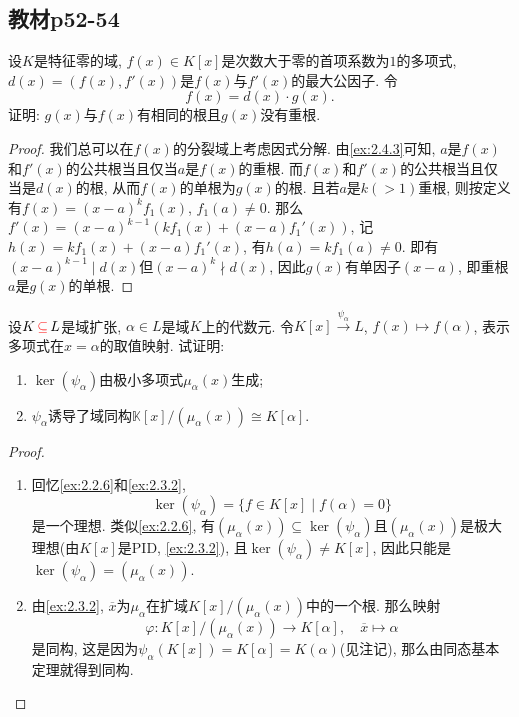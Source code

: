 \subsection{教材p52-54}

\begin{problem}\label{ex:3.1.1}
    设$K$是特征零的域, $f(x) \in K[x]$是次数大于零的首项系数为$1$的多项式, $d(x) = (f(x), f'(x))$是$f(x)$与$f'(x)$的最大公因子. 令
    \[
        f(x) = d(x) \cdot g(x).
    \]
    证明: $g(x)$与$f(x)$有相同的根且$g(x)$没有重根.
\end{problem}

\begin{proof}
    我们总可以在$f(x)$的分裂域上考虑因式分解. 由\ref{ex:2.4.3}可知, $a$是$f(x)$和$f'(x)$的公共根当且仅当$a$是$f(x)$的重根. 而$f(x)$和$f'(x)$的公共根当且仅当是$d(x)$的根, 从而$f(x)$的单根为$g(x)$的根. 且若$a$是$k(>1)$重根, 则按定义有$f(x) = (x - a)^kf_1(x)$, $f_1(a) \neq 0$. 那么$f'(x) = (x - a)^{k - 1}(kf_1(x) + (x - a)f_1'(x))$, 记$h(x) = kf_1(x) + (x - a)f_1'(x)$, 有$h(a) = kf_1(a) \neq 0$. 即有$(x - a)^{k - 1} \mid d(x)$但$(x - a)^k \nmid d(x)$, 因此$g(x)$有单因子$(x - a)$, 即重根$a$是$g(x)$的单根.
\end{proof}

\begin{problem}\label{ex:3.1.2}
    设$K \,\textcolor{red}{\subseteq}\, L$是域扩张, $\alpha \in L$是域$K$上的代数元. 令$K[x] \xrightarrow{\psi_{\alpha}}L$, $f(x) \mapsto f(\alpha)$, 表示多项式在$x = \alpha$的取值映射. 试证明:
    \begin{enumerate}[(1)]
        \item $\ker(\psi_\alpha)$由极小多项式$\mu_\alpha(x)$生成;
        \item $\psi_\alpha$诱导了域同构$\mathbb{K}[x]/(\mu_\alpha(x)) \cong K[\alpha]$.
    \end{enumerate}
\end{problem}

\begin{proof}
    \begin{enumerate}[(1)]
        \item 回忆\ref{ex:2.2.6}和\ref{ex:2.3.2},
        \[
            \ker(\psi_\alpha) = \{f \in K[x] \mid f(\alpha) = 0\}
        \]
        是一个理想. 类似\ref{ex:2.2.6}, 有$(\mu_\alpha(x)) \subseteq \ker(\psi_\alpha)$且$(\mu_\alpha(x))$是极大理想(由$K[x]$是PID, \ref{ex:2.3.2}), 且$\ker(\psi_\alpha) \neq K[x]$, 因此只能是$\ker(\psi_\alpha) = (\mu_\alpha(x))$.
        \item 由\ref{ex:2.3.2}, $\overline{x}$为$\mu_\alpha$在扩域$K[x]/(\mu_\alpha(x))$中的一个根. 那么映射
        \[
            \varphi: K[x]/(\mu_\alpha(x)) \to K[\alpha],\quad \overline{x} \mapsto \alpha
        \]
        是同构, 这是因为$\psi_\alpha(K[x]) = K[\alpha] = K(\alpha)$(见注记), 那么由同态基本定理就得到同构.
    \end{enumerate}
\end{proof}

